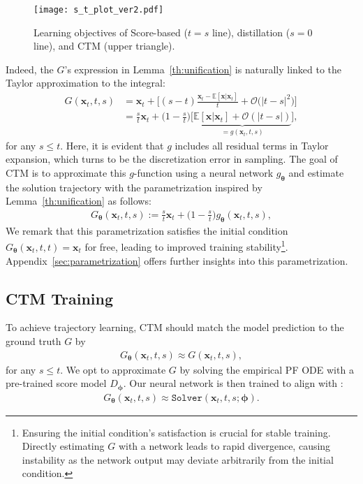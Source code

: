 \documentclass{article} \usepackage{iclr2024_coNFErence,times}
\newcommand{\abs}[1]{\left|#1\right|}
\newcommand{\djk}[1]{{\color{black}{{#1}}}}
\theoremstyle{definition}
\theoremstyle{remark}
\begin{document}
\begin{wrapfigure}{r}{0.3\textwidth}
	\vskip -0.12in
	\centering
	\texttt{[image: s\_t\_plot\_ver2.pdf]}
	\caption{Learning objectives of Score-based ($t=s$ line), distillation ($s=0$ line), and CTM (upper triangle).}
	\label{fig:s_t_plot}
  \vskip -0.5in
\end{wrapfigure}
Indeed, the $G$'s expression in Lemma~\ref{th:unification} is naturally linked to the Taylor approximation to the integral:
\begin{align*}
    G(\mathbf{x}_{t},t,s)&= \mathbf{x}_{t}+\bigg[(s-t)\frac{\mathbf{x}_{t}-\mathbb{E}[\mathbf{x}\vert\mathbf{x}_{t}]}{t}+\mathcal{O}\big(\abs{t-s}^2\big)\bigg]
\\&=\frac{s}{t}\mathbf{x}_{t}+\Big(1-\frac{s}{t}\Big)
    \big[\underset{=g(\mathbf{x}_t, t, s)}{\underbrace{\mathbb{E}[\mathbf{x}\vert\mathbf{x}_{t}]+\mathcal{O}\left(\abs{t-s}\right)}}\big],
\end{align*}
for any $s\leq t$. 
Here, it is evident that $g$ includes all residual terms in Taylor expansion, which turns to be the discretization error in sampling. The goal of CTM is to approximate this $g$-function using a neural network $g_{\bm{\theta}}$ and estimate the solution trajectory with the parametrization inspired by Lemma~\ref{th:unification} as follows:
\begin{align*}G_{\bm{\theta}}(\mathbf{x}_{t},t,s):=\frac{s}{t}\mathbf{x}_{t}+\Big(1-\frac{s}{t}\Big)g_{\bm{\theta}}(\mathbf{x}_{t},t,s),
\end{align*}
We remark that this parametrization satisfies the initial condition $G_{\bm{\theta}}(\mathbf{x}_{t},t,t)=\mathbf{x}_{t}$ for free, leading to improved training stability\footnote{Ensuring the initial condition's satisfaction is crucial for stable training. Directly estimating $G$ with a network leads to rapid divergence, causing instability as the network output may deviate arbitrarily from the initial condition.}. Appendix~\ref{sec:parametrization} offers further insights into this parametrization.


\subsection{CTM Training}


To achieve trajectory learning, CTM should match the model prediction to the ground truth $G$ by
\begin{align*}
    G_{\bm{\theta}}(\mathbf{x}_{t},t,s)\approx G(\mathbf{x}_{t},t,s),
\end{align*}
for any $s\le t$. We opt to approximate $G$ by solving the empirical PF ODE with a pre-trained score model $D_{\bm{\phi}}$. Our neural network is then trained to align with \djk{the reconstruction}:
\begin{align}\label{eq:global}
    G_{\bm{\theta}}(\mathbf{x}_{t},t,s)\approx \texttt{Solver}(\mathbf{x}_{t},t,s;\bm{\phi}).
\end{align}
\end{document}
